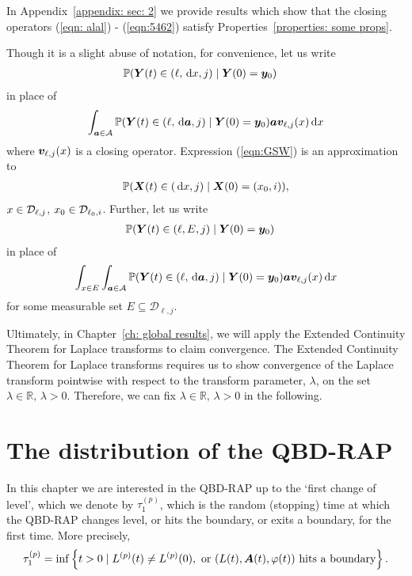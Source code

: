 In Appendix~\ref{appendix: sec: 2} we provide results which show that the closing operators (\ref{eqn: alal}) - (\ref{eqn:5462}) satisfy Properties~\ref{properties: some props}. 

Though it is a slight abuse of notation, for convenience, let us write 
\begin{align*}
	& \mathbb P({\boldsymbol Y}(t) \in (\ell,\, \mathrm{d} x, j)\mid \boldsymbol Y(0)=\boldsymbol y_0 )
\end{align*}
in place of 
\begin{align}
	\int_{\boldsymbol a \in\mathcal A}\mathbb P({\boldsymbol Y}(t) \in (\ell,\, \mathrm{d} \boldsymbol a, j)\mid \boldsymbol Y(0)=\boldsymbol y_0)\boldsymbol a\boldsymbol v_{\ell,j}(x)\, \mathrm{d} x \label{eqn:GSW}
\end{align}
where \(\boldsymbol v_{\ell,j}(x)\) is a closing operator. Expression (\ref{eqn:GSW}) is an approximation to 
\begin{align}
	\mathbb P(\boldsymbol X(t)\in(\, \mathrm{d} x, j)\mid \boldsymbol X(0)=(x_0, i)),
\end{align}
\(x\in \mathcal{D}_{\ell,j}\), \(x_0\in\mathcal{D}_{\ell_0,i}\).
Further, let us write 
\begin{align*}
	& \mathbb P({\boldsymbol Y} (t) \in (\ell,E, j)\mid \boldsymbol Y (0)=\boldsymbol y_0 )
\end{align*}
in place of 
\begin{align}
	\int_{x\in E}\int_{\boldsymbol a \in\mathcal A}\mathbb P({\boldsymbol Y} (t) \in (\ell,\, \mathrm{d} \boldsymbol a, j)\mid \boldsymbol Y (0)=\boldsymbol y_0  )\boldsymbol a\boldsymbol v_{\ell,j}(x)\, \mathrm{d} x \label{eqn:GSW2}
\end{align}
for some measurable set \(E\subseteq \mathcal D_{\ell,j}\). 

Ultimately, in Chapter~\ref{ch: global results}, we will apply the Extended Continuity Theorem for Laplace transforms \cite[Chapter XIII, Theorem 2a]{feller1957} to claim convergence. The Extended Continuity Theorem for Laplace transforms requires us to show convergence of the Laplace transform pointwise with respect to the transform parameter, \(\lambda\), on the set \(\lambda\in\mathbb R,\, \lambda>0\). Therefore, we can fix \(\lambda\in\mathbb R,\, \lambda>0\) in the following. 

\section{The distribution of the QBD-RAP}\label{sec: qbd dists}
In this chapter we are interested in the QBD-RAP up to the `first change of level', which we denote by \(\tau_1^{(p)}\), which is the random (stopping) time at which the QBD-RAP changes level, or hits the boundary, or exits a boundary, for the first time. More precisely, 
\[\tau_1^{(p)} = \inf\left\{t>0\mid L^{(p)}(t)\neq L^{(p)}(0),\mbox{ or }(L(t),\boldsymbol A(t),\varphi(t))\mbox{ hits a boundary}\right\}.\]

